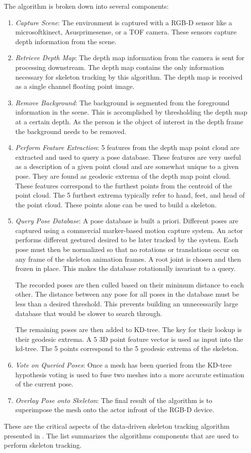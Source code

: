 \documentclass[conference]{IEEEtran}
\begin{document}
The algorithm is broken down into several components:
\begin{enumerate}
  \item \emph{Capture Scene}: The environment is captured with a RGB-D sensor like a microsoft\texttrademark kinect\texttrademark, Asus\texttrademark primesense, or a TOF camera. These sensors capture depth information from the scene.
  \item \emph{Retrieve Depth Map}: The depth map information from the camera is sent for processing downstream. The depth map contains the only information necessary for skeleton tracking by this algorithm. The depth map is received as a single channel floating point image.
  \item \emph{Remove Background}: The background is segmented from the foreground information in the scene. This is accomplished by thresholding the depth map at a certain depth. As the person is the object of interest in the depth frame the background needs to be removed. 
  \item \emph{Perform Feature Extraction}: 5 features from the depth map point cloud are extracted and used to query a pose database. These features are very useful as a description of a given point cloud and are somewhat unique to a given pose. They are found as geodesic extrema of the depth map point cloud. These features correspond to the furthest points from the centroid of the point cloud. The 5 furthest extrema typically refer to hand, feet, and head of the point cloud. These points alone can be used to build a skeleton.
  \item \emph{Query Pose Database}: A pose database is built a priori. Different poses are captured using a commercial marker-based motion capture system. An actor performs different gestured desired to be later tracked by the system. Each pose must then be normalized so that no rotations or translations occur on any frame of the skeleton animation frames. A root joint is chosen and then frozen in place. This makes the database rotationally invariant to a query.

  The recorded poses are then culled based on their minimum distance to each other. The distance between any pose for all poses in the database must be less than a desired threshold. This prevents building an unnecessarily large database that would be slower to search through.

  The remaining poses are then added to KD-tree. The key for their lookup is their geodesic extrema. A 5 3D point feature vector is used as input into the kd-tree. The 5 points correspond to the 5 geodesic extrema of the skeleton.
  \item \emph{Vote on Queried Poses}: Once a mesh has been queried from the KD-tree hypothesis voting is used to fuse two meshes into a more accurate estimation of the current pose.
  \item \emph{Overlay Pose onto Skeleton}: The final result of the algorithm is to superimpose the mesh onto the actor infront of the RGB-D device.
\end{enumerate}
These are the critical aspects of the data-driven skeleton tracking algorithm presented in \cite{Baak2011}. The list summarizes the algorithms components that are used to perform skeleton tracking.
\end{document}
